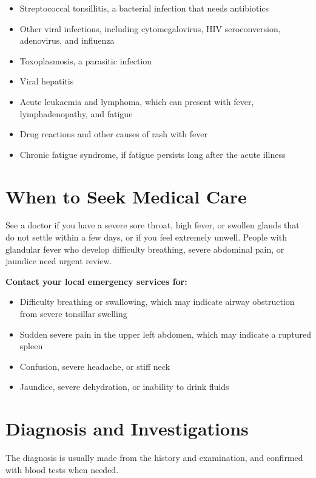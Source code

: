 \begin{itemize}
    \item Streptococcal tonsillitis, a bacterial infection that needs antibiotics
    \item Other viral infections, including cytomegalovirus, HIV seroconversion, adenovirus, and influenza
    \item Toxoplasmosis, a parasitic infection
    \item Viral hepatitis
    \item Acute leukaemia and lymphoma, which can present with fever, lymphadenopathy, and fatigue
    \item Drug reactions and other causes of rash with fever
    \item Chronic fatigue syndrome, if fatigue persists long after the acute illness
\end{itemize}

\section*{When to Seek Medical Care}
See a doctor if you have a severe sore throat, high fever, or swollen glands that do not settle within a few days, or if you feel extremely unwell. People with glandular fever who develop difficulty breathing, severe abdominal pain, or jaundice need urgent review.

\textbf{Contact your local emergency services for:}
\begin{itemize}
    \item Difficulty breathing or swallowing, which may indicate airway obstruction from severe tonsillar swelling
    \item Sudden severe pain in the upper left abdomen, which may indicate a ruptured spleen
    \item Confusion, severe headache, or stiff neck
    \item Jaundice, severe dehydration, or inability to drink fluids
\end{itemize}

\section*{Diagnosis and Investigations}
The diagnosis is usually made from the history and examination, and confirmed with blood tests when needed.

